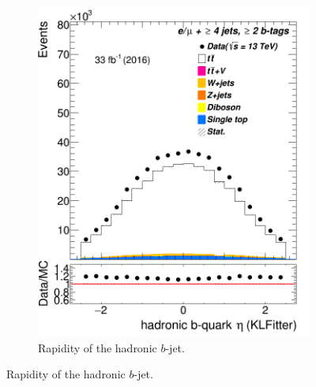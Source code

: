 \begin{figure}
\begin{subfigure}{0.25\textwidth}
	\includegraphics[width=\linewidth]{ControlPlots_emujets_2016_4incl_2incl/klf_bhad_eta_emujets_2016.png}
	\caption{Rapidity of the hadronic $b$-jet.} \label{fig:K29}
\end{subfigure}


	\medskip


\end{figure}
